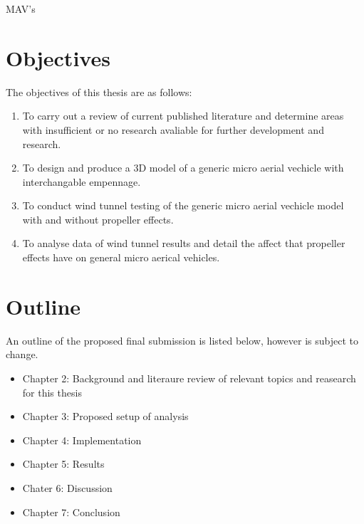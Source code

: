 MAV's




\section{Objectives}
\label{sec:Objectives}
The objectives of this thesis are as follows:

\begin{enumerate}
  \item To carry out a review of current published literature and determine areas with insufficient or no research avaliable for further development and research.
  \item To design and produce a 3D model of a generic micro aerial vechicle with interchangable empennage.
  \item To conduct wind tunnel testing of the generic micro aerial vechicle model with and without propeller effects.
  \item To analyse data of wind tunnel results and detail the affect that propeller effects have on general micro aerical vehicles.
\end{enumerate}

\section{Outline}
\label{sec:Outline}
An outline of the proposed final submission is listed below, however is subject to change.

\begin{itemize}
  \item Chapter 2: Background and literaure review of relevant topics and reasearch for this thesis
  \item Chapter 3: Proposed setup of analysis
  \item Chapter 4: Implementation
  \item Chapter 5: Results
  \item Chater 6: Discussion
  \item Chapter 7: Conclusion
\end{itemize}





